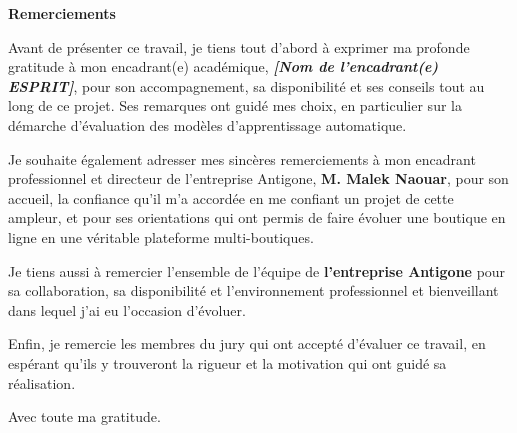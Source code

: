 \begin{center}
\textbf{\Huge Remerciements}
\end{center}

\vspace{1cm}

\hspace{0.5cm}Avant de présenter ce travail, je tiens tout d'abord à exprimer ma profonde gratitude à mon encadrant(e) académique, \textbf{\textit{[Nom de l'encadrant(e) ESPRIT]}}, pour son accompagnement, sa disponibilité et ses conseils tout au long de ce projet. Ses remarques ont guidé mes choix, en particulier sur la démarche d'évaluation des modèles d'apprentissage automatique.

\vspace{0.5cm}

Je souhaite également adresser mes sincères remerciements à mon encadrant professionnel et directeur de l'entreprise Antigone, \textbf{M. Malek Naouar}, pour son accueil, la confiance qu'il m'a accordée en me confiant un projet de cette ampleur, et pour ses orientations qui ont permis de faire évoluer une boutique en ligne en une véritable plateforme multi-boutiques.

\vspace{0.5cm}

Je tiens aussi à remercier l'ensemble de l'équipe de \textbf{l'entreprise Antigone} pour sa collaboration, sa disponibilité et l'environnement professionnel et bienveillant dans lequel j'ai eu l'occasion d'évoluer.

\vspace{0.5cm}

Enfin, je remercie les membres du jury qui ont accepté d'évaluer ce travail, en espérant qu'ils y trouveront la rigueur et la motivation qui ont guidé sa réalisation.

\vspace{0.5cm}

\begin{center}
Avec toute ma gratitude.
\end{center}

